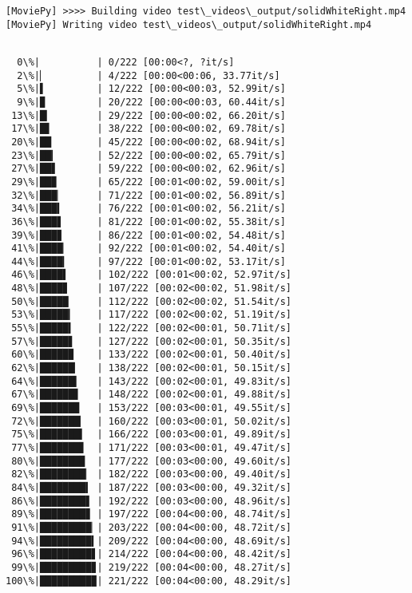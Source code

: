 \documentclass[11pt]{article}
\begin{document}
    \begin{Verbatim}[commandchars=\\\{\}]
[MoviePy] >>>> Building video test\_videos\_output/solidWhiteRight.mp4
[MoviePy] Writing video test\_videos\_output/solidWhiteRight.mp4

    \end{Verbatim}

    \begin{Verbatim}[commandchars=\\\{\}]

  0\%|          | 0/222 [00:00<?, ?it/s]
  2\%|▏         | 4/222 [00:00<00:06, 33.77it/s]
  5\%|▌         | 12/222 [00:00<00:03, 52.99it/s]
  9\%|▉         | 20/222 [00:00<00:03, 60.44it/s]
 13\%|█▎        | 29/222 [00:00<00:02, 66.20it/s]
 17\%|█▋        | 38/222 [00:00<00:02, 69.78it/s]
 20\%|██        | 45/222 [00:00<00:02, 68.94it/s]
 23\%|██▎       | 52/222 [00:00<00:02, 65.79it/s]
 27\%|██▋       | 59/222 [00:00<00:02, 62.96it/s]
 29\%|██▉       | 65/222 [00:01<00:02, 59.00it/s]
 32\%|███▏      | 71/222 [00:01<00:02, 56.89it/s]
 34\%|███▍      | 76/222 [00:01<00:02, 56.21it/s]
 36\%|███▋      | 81/222 [00:01<00:02, 55.38it/s]
 39\%|███▊      | 86/222 [00:01<00:02, 54.48it/s]
 41\%|████▏     | 92/222 [00:01<00:02, 54.40it/s]
 44\%|████▎     | 97/222 [00:01<00:02, 53.17it/s]
 46\%|████▌     | 102/222 [00:01<00:02, 52.97it/s]
 48\%|████▊     | 107/222 [00:02<00:02, 51.98it/s]
 50\%|█████     | 112/222 [00:02<00:02, 51.54it/s]
 53\%|█████▎    | 117/222 [00:02<00:02, 51.19it/s]
 55\%|█████▍    | 122/222 [00:02<00:01, 50.71it/s]
 57\%|█████▋    | 127/222 [00:02<00:01, 50.35it/s]
 60\%|█████▉    | 133/222 [00:02<00:01, 50.40it/s]
 62\%|██████▏   | 138/222 [00:02<00:01, 50.15it/s]
 64\%|██████▍   | 143/222 [00:02<00:01, 49.83it/s]
 67\%|██████▋   | 148/222 [00:02<00:01, 49.88it/s]
 69\%|██████▉   | 153/222 [00:03<00:01, 49.55it/s]
 72\%|███████▏  | 160/222 [00:03<00:01, 50.02it/s]
 75\%|███████▍  | 166/222 [00:03<00:01, 49.89it/s]
 77\%|███████▋  | 171/222 [00:03<00:01, 49.47it/s]
 80\%|███████▉  | 177/222 [00:03<00:00, 49.60it/s]
 82\%|████████▏ | 182/222 [00:03<00:00, 49.40it/s]
 84\%|████████▍ | 187/222 [00:03<00:00, 49.32it/s]
 86\%|████████▋ | 192/222 [00:03<00:00, 48.96it/s]
 89\%|████████▊ | 197/222 [00:04<00:00, 48.74it/s]
 91\%|█████████▏| 203/222 [00:04<00:00, 48.72it/s]
 94\%|█████████▍| 209/222 [00:04<00:00, 48.69it/s]
 96\%|█████████▋| 214/222 [00:04<00:00, 48.42it/s]
 99\%|█████████▊| 219/222 [00:04<00:00, 48.27it/s]
100\%|█████████▉| 221/222 [00:04<00:00, 48.29it/s]
    \end{Verbatim}
\end{document}
